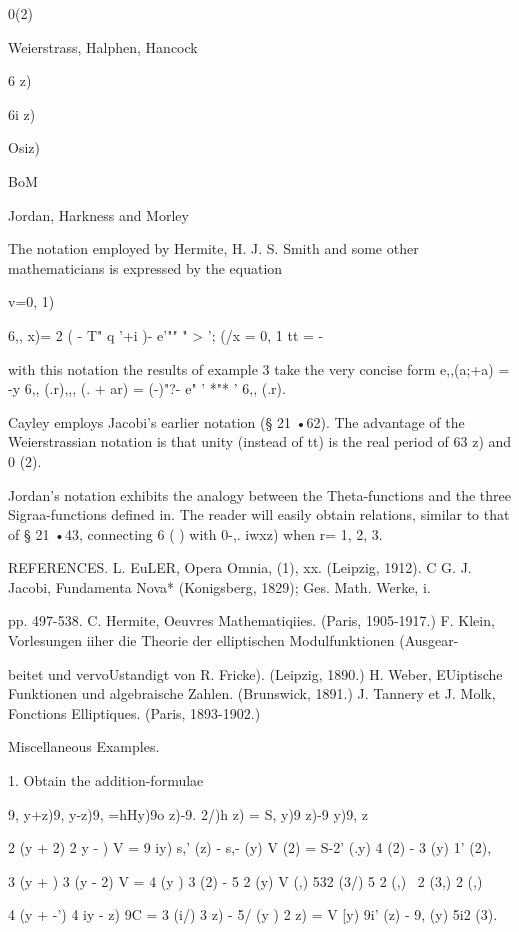  0(2)

Weierstrass, Halphen, Hancock

6 z)

6i z)

Osiz)

BoM

Jordan, Harkness and Morley

The notation employed by Hermite, H. J. S. Smith and some other
mathematicians is expressed by the equation

v=0, 1)

6,, x)= 2 ( - T" q '+i )- e'"" " > '; (/x = 0, 1 tt = -

with this notation the results of example 3 take the very
concise form e,,(a;+a) = -y 6,, (.r),,, (. + ar) = (-)"?- e" '
*"* ' 6,, (.r).

Cayley employs Jacobi's earlier notation (§ 21 •62). The advantage of
the Weierstrassian notation is that unity (instead of tt) is the real
period of 63 z) and 0 (2).

Jordan's notation exhibits the analogy between the Theta-functions and
the three Sigraa-functions defined in. The reader will easily
obtain relations, similar to that of § 21 •43, connecting 6 ( ) with
0-,. iwxz) when r= 1, 2, 3.

REFERENCES. L. EuLER, Opera Omnia, (1), xx. (Leipzig, 1912). C G. J.
Jacobi, Fundamenta Nova* (Konigsberg, 1829); Ges. Math. Werke, i.

pp. 497-538. C. Hermite, Oeuvres Mathematiqiies. (Paris, 1905-1917.)
F. Klein, Vorlesungen iiher die Theorie der elliptischen
Modulfunktionen (Ausgear-

beitet und vervoUstandigt von R. Fricke). (Leipzig, 1890.) H. Weber,
EUiptische Funktionen und algebraische Zahlen. (Brunswick, 1891.) J.
Tannery et J. Molk, Fonctions Elliptiques. (Paris, 1893-1902.)

Miscellaneous Examples.

1. Obtain the addition-formulae

9, y+z)9, y-z)9, =hHy)9o z)-9. 2/)h z) = S, y)9 z)-9 y)9, z\

 2 (y + 2) 2 y - ) V = 9 iy) s,' (z) - s,- (y) V (2) = S-2' (.y) 4 (2)
- 3 (y) 1' (2),

 3 (y + ) 3 (y - 2) V = 4 (y ) 3 (2) - 5 2 (y) V (,) 532 (3/) 5 2 (,)
\ 2 (3,) 2 (,)

 4 (y + -') 4 iy - z) 9C = 3 (i/) 3 z) - 5/ (y ) 2 z) = V [y) 9i' (z)
- 9, (y) 5i2 (3).

